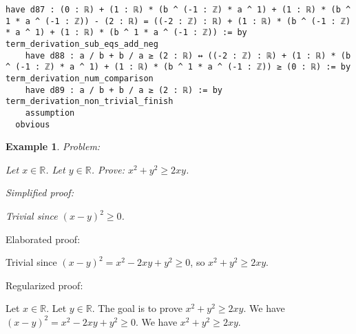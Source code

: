 \documentclass{article}
\newtheorem{example}{Example}
\begin{document}
\begin{tcolorbox}[colback=white!10, width=\linewidth]
\begin{lstlisting}[language=Lean4]
    have d87 : (0 : ℝ) + (1 : ℝ) * (b ^ (-1 : ℤ) * a ^ 1) + (1 : ℝ) * (b ^ 1 * a ^ (-1 : ℤ)) - (2 : ℝ) = ((-2 : ℤ) : ℝ) + (1 : ℝ) * (b ^ (-1 : ℤ) * a ^ 1) + (1 : ℝ) * (b ^ 1 * a ^ (-1 : ℤ)) := by term_derivation_sub_eqs_add_neg
    have d88 : a / b + b / a ≥ (2 : ℝ) ↔ ((-2 : ℤ) : ℝ) + (1 : ℝ) * (b ^ (-1 : ℤ) * a ^ 1) + (1 : ℝ) * (b ^ 1 * a ^ (-1 : ℤ)) ≥ (0 : ℝ) := by term_derivation_num_comparison
    have d89 : a / b + b / a ≥ (2 : ℝ) := by term_derivation_non_trivial_finish
    assumption
  obvious

\end{lstlisting}
\end{tcolorbox}


\begin{example}
Problem:
\begin{tcolorbox}[colback=yellow!10, width=\linewidth]
Let $x\in\mathbb{R}$. Let $y\in\mathbb{R}$.
    Prove: $x^2 + y^2 \ge 2xy$.
\end{tcolorbox}

Simplified proof:
\begin{tcolorbox}[colback=blue!10, width=\linewidth]
Trivial since $(x-y)^2 \ge 0$.
\end{tcolorbox}
\end{example}

Elaborated proof:
\begin{tcolorbox}[colback=green!10, width=\linewidth]
Trivial since $(x-y)^2 = x^2 -2xy + y^2 \ge 0$, so $x^2 + y^2 \ge 2xy$.
\end{tcolorbox}

Regularized proof:
\begin{tcolorbox}[colback=red!10, width=\linewidth]
Let $x\in\mathbb{R}$.
Let $y\in\mathbb{R}$.
The goal is to prove $x^2 + y^2 \ge 2xy$.
We have ${{(x-y)}}^2 = x^2 -2xy + y^2 \ge 0$.
We have $x^2 + y^2 \ge 2xy$.
\end{tcolorbox}
\end{document}

